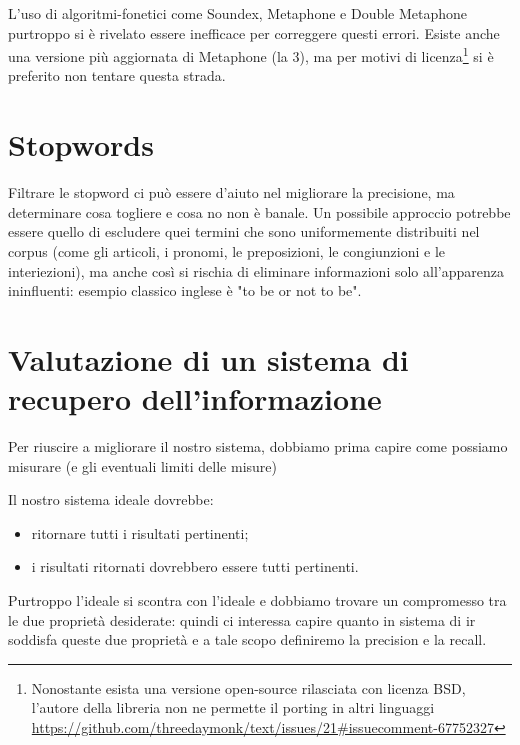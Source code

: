 L’uso di \gls{algoritmi-fonetici}\glsfirstoccur{} come Soundex, Metaphone e Double Metaphone purtroppo si è rivelato essere inefficace per correggere questi errori. Esiste anche una versione più aggiornata di Metaphone (la 3), ma per motivi di licenza\footnote{Nonostante esista una versione open-source rilasciata con licenza BSD, l'autore della libreria non ne permette il porting in altri linguaggi \url{https://github.com/threedaymonk/text/issues/21\#issuecomment-67752327}} si è preferito non tentare questa strada.

\section{Stopwords}
\label{sec:stopword}
Filtrare le stopword ci può essere d’aiuto nel migliorare la precisione, ma determinare cosa togliere e cosa no non è banale. Un possibile approccio potrebbe essere quello di escludere quei termini che sono uniformemente distribuiti nel \gls{corpus} (come gli articoli, i pronomi, le preposizioni, le congiunzioni e le interiezioni), ma anche così si rischia di eliminare informazioni solo all'apparenza ininfluenti: esempio classico inglese è "to be or not to be".

\section{Valutazione di un sistema di recupero dell'informazione}
Per riuscire a migliorare il nostro sistema, dobbiamo prima capire come possiamo misurare (e gli eventuali limiti delle misure)

Il nostro sistema ideale dovrebbe:
\begin{itemize}
    \item ritornare tutti i risultati pertinenti;
    \item i risultati ritornati dovrebbero essere tutti pertinenti.
\end{itemize}

Purtroppo l’ideale si scontra con l’ideale e dobbiamo trovare un compromesso tra le due proprietà desiderate: quindi ci interessa capire quanto in sistema di \gls{ir} soddisfa queste due proprietà e a tale scopo definiremo la precision e la recall.


